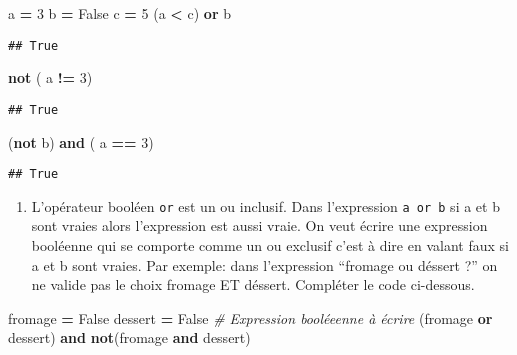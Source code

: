 \documentclass[
]{book}
\newenvironment{Shaded}{\begin{snugshade}}{\end{snugshade}}
\newcommand{\CommentTok}[1]{\textcolor[rgb]{0.56,0.35,0.01}{\textit{#1}}}
\newcommand{\DecValTok}[1]{\textcolor[rgb]{0.00,0.00,0.81}{#1}}
\newcommand{\KeywordTok}[1]{\textcolor[rgb]{0.13,0.29,0.53}{\textbf{#1}}}
\newcommand{\NormalTok}[1]{#1}
\newcommand{\OperatorTok}[1]{\textcolor[rgb]{0.81,0.36,0.00}{\textbf{#1}}}
\newcommand{\VariableTok}[1]{\textcolor[rgb]{0.00,0.00,0.00}{#1}}
\providecommand{\tightlist}{%
  \setlength{\itemsep}{0pt}\setlength{\parskip}{0pt}}
\def\tightlist{}
\begin{document}
\begin{Shaded}
\begin{Highlighting}[]
\NormalTok{a }\OperatorTok{=} \DecValTok{3}
\NormalTok{b }\OperatorTok{=} \VariableTok{False}
\NormalTok{c }\OperatorTok{=} \DecValTok{5}
\NormalTok{(a }\OperatorTok{\textless{}}\NormalTok{  c) }\KeywordTok{or}\NormalTok{ b}
\end{Highlighting}
\end{Shaded}

\begin{verbatim}
## True
\end{verbatim}

\begin{Shaded}
\begin{Highlighting}[]
\KeywordTok{not}\NormalTok{ ( a }\OperatorTok{!=} \DecValTok{3}\NormalTok{)}
\end{Highlighting}
\end{Shaded}

\begin{verbatim}
## True
\end{verbatim}

\begin{Shaded}
\begin{Highlighting}[]
\NormalTok{(}\KeywordTok{not}\NormalTok{ b) }\KeywordTok{and}\NormalTok{ ( a }\OperatorTok{==} \DecValTok{3}\NormalTok{) }
\end{Highlighting}
\end{Shaded}

\begin{verbatim}
## True
\end{verbatim}

\begin{enumerate}
\def\labelenumi{\arabic{enumi}.}
\setcounter{enumi}{3}
\tightlist
\item
  L'opérateur booléen \texttt{or} est un ou inclusif. Dans l'expression \texttt{a\ or\ b} si a et b sont vraies alors l'expression est aussi vraie. On veut écrire une expression booléenne qui se comporte comme un ou exclusif c'est à dire en valant faux si a et b sont vraies. Par exemple: dans l'expression ``fromage ou déssert ?'' on ne valide pas le choix fromage ET déssert. Compléter le code ci-dessous.
\end{enumerate}

\begin{Shaded}
\begin{Highlighting}[]
\NormalTok{fromage }\OperatorTok{=} \VariableTok{False}
\NormalTok{dessert }\OperatorTok{=} \VariableTok{False}
\CommentTok{\# Expression booléeenne à écrire}
\NormalTok{(fromage }\KeywordTok{or}\NormalTok{ dessert) }\KeywordTok{and} \KeywordTok{not}\NormalTok{(fromage }\KeywordTok{and}\NormalTok{ dessert)}
\end{Highlighting}
\end{Shaded}
\end{document}
